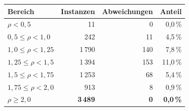 \begin{tabular}{l r r r}
\toprule
Bereich & Instanzen & Abweichungen & Anteil \\
\midrule
$\rho < 0{,}5$ & 11 & 0 & 0{,}0\,\% \\
$0{,}5 \le \rho < 1{,}0$ & 242 & 11 & 4{,}5\,\% \\
$1{,}0 \le \rho < 1{,}25$ & 1\,790 & 140 & 7{,}8\,\% \\
$1{,}25 \le \rho < 1{,}5$ & 1\,394 & 153 & 11{,}0\,\% \\
$1{,}5 \le \rho < 1{,}75$ & 1\,253 & 68 & 5{,}4\,\% \\
$1{,}75 \le \rho < 2{,}0$ & 913 & 8 & 0{,}9\,\% \\
\midrule
$\rho \ge 2{,}0$ & \textbf{3\,489} & \textbf{0} & \textbf{0{,}0\,\%} \\
\bottomrule
\end{tabular}
